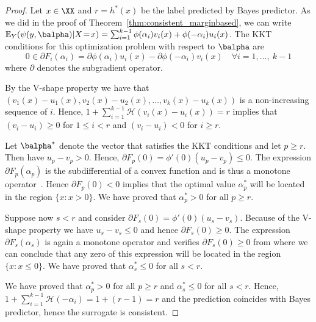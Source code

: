 \begin{proof}
Let $x \in \XX$ and $r = h^*(x)$ be the label predicted by Bayes predictor. As we did in the proof of Theorem~\ref{thm:consistent_marginbased}, we can write $\mathbb{E}_Y(\psi(y, \balpha) | X\!=\!x) = \sum_{i=1}^{k-1} \phi(\alpha_i)v_i(x) + \phi(-\alpha_i)u_i(x)$.
The KKT conditions for this optimization problem with respect to $\balpha$ are
\begin{equation}\label{eq:partial_deriv}
0 \in  \partial F_i(\alpha_i) =  \partial \phi(\alpha_i) u_i(x)  - \partial \phi(-\alpha_i) v_i(x)\quad \forall i = 1, \ldots, ~{k-1} 
\end{equation}
where $\partial$ denotes the subgradient operator.

By the V-shape property we have that  $(v_1(x) - u_1(x), v_2(x) - u_2(x), \ldots, v_k(x) - u_k(x))$ is a non-increasing sequence of $i$. Hence, $1 + \sum_{i=1}^{k-1} \mathcal{H}(v_i (x) - u_i(x)) = r$ implies that $(v_i - u_i) \geq 0$ for $1 \leq i < r$ and $(v_i - u_i) < 0$ for $i \geq r$. 


Let $\balpha^*$ denote the vector that satisfies the KKT conditions and let $p \geq r$. Then have $u_p - v_p > 0$. Hence, $\partial F_p(0) = {\phi'(0)(u_p - v_p)} \leq 0$. The expression ${\partial F_p(\alpha_p)}$ is the subdifferential of a convex function and is thus a monotone operator~\citep{rockafellar1970maximal}. Hence ${\partial F_p(0)} < 0$ implies that the optimal value $\alpha^*_p$ will be located in the region $\{x : x > 0\}$. We have proved that $\alpha^*_p > 0$ for all $p \geq r$.


Suppose now $s < r$ and consider $\partial F_{s}(0) = \phi'(0)(u_{s} - v_{s})$. Because of the V-shape property we have $u_{s} - v_{s} \leq 0$ and hence $\partial F_{s}(0) \geq 0$. The expression ${\partial F_{s}(\alpha_{s})}$ is again a monotone operator and verifies $\partial F_{s}(0) \geq 0$ from where we can conclude that any zero of this expression will be located in the region $\{x: x \leq 0\}$. We have proved that $\alpha^*_s \leq 0$ for all $s < r$.

We have proved that $\alpha^*_p > 0$ for all $p \geq r$ and $\alpha^*_s \leq 0$ for all $s < r$. Hence, $1 + \sum_{i=1}^{k-1}\mathcal{H}(-\alpha_i) = 1 + (r - 1) = r$ and the prediction coincides with Bayes predictor, hence the surrogate is consistent.
\end{proof}





